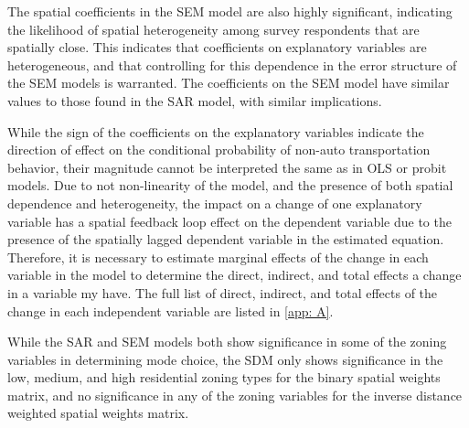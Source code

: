The spatial coefficients in  the SEM model are also highly significant, indicating the likelihood of spatial heterogeneity among survey respondents that are spatially close.  This indicates that coefficients on explanatory variables are heterogeneous,  and that controlling for this dependence in the error structure of the SEM models is warranted.  The coefficients on the SEM model have similar values to those found in the SAR model, with similar implications.   

While the sign of the coefficients on the explanatory variables indicate the direction of effect on the conditional probability of non-auto transportation behavior, their magnitude cannot be interpreted the same as in OLS or probit models.  Due to not non-linearity of the model, and the presence of both spatial dependence and heterogeneity, the impact on a change of one explanatory variable  has a spatial feedback loop effect on the dependent variable due to the presence of the spatially lagged dependent variable in the estimated equation.  Therefore, it is necessary to estimate marginal effects of the change in each variable in the model to determine the direct, indirect, and total effects a change in a variable my have. The full list of direct, indirect, and total effects of the change in each independent variable are listed in \autoref{app: A}.

While the SAR and SEM models both show significance in some of the zoning variables in determining mode choice, the SDM only shows significance in the low, medium, and high residential zoning types for the binary spatial weights matrix, and no significance in any of the zoning variables for the inverse distance weighted spatial weights matrix.      
\begin{singlespace}\footnotesize
	\label{table:spatialdurbinmodels} 
	
\end{singlespace} 	

